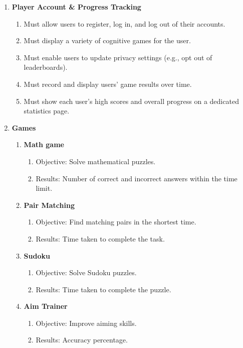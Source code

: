 \documentclass[11pt,a4paper]{article}
\begin{document}
\begin{enumerate}[label=\arabic*.]

  \item \textbf{Player Account \& Progress Tracking}
    \begin{enumerate}[label=\alph*)]
      \item Must allow users to register, log in, and log out of their accounts.
      \item Must display a variety of cognitive games for the user.
      \item Must enable users to update privacy settings (e.g., opt out of leaderboards).
      \item Must record and display users’ game results over time.
      \item Must show each user’s high scores and overall progress on a dedicated statistics page.
    \end{enumerate}

  \item \textbf{Games}
    \begin{enumerate}[label=\alph*)]
      \item \textbf{Math game}
        \begin{enumerate}[label=\roman*.]
          \item Objective: Solve mathematical puzzles.
          \item Results: Number of correct and incorrect answers within the time limit.
        \end{enumerate}
      \item \textbf{Pair Matching}
        \begin{enumerate}[label=\roman*.]
          \item Objective: Find matching pairs in the shortest time.
          \item Results: Time taken to complete the task.
        \end{enumerate}
      \item \textbf{Sudoku}
        \begin{enumerate}[label=\roman*.]
          \item Objective: Solve Sudoku puzzles.
          \item Results: Time taken to complete the puzzle.
        \end{enumerate}
      \item \textbf{Aim Trainer}
        \begin{enumerate}[label=\roman*.]
          \item Objective: Improve aiming skills.
          \item Results: Accuracy percentage.
        \end{enumerate}
    \end{enumerate}


\end{enumerate}
\end{document}
